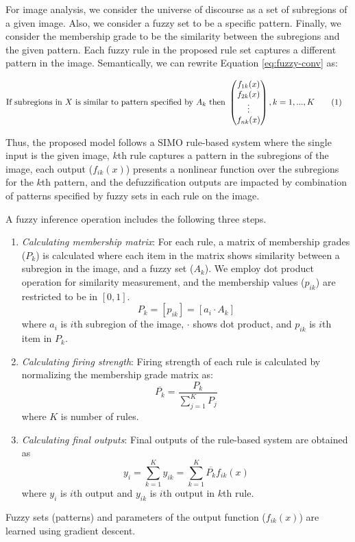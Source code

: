 \documentclass{article}
\newcommand\numberthis{\addtocounter{equation}{1}\tag{\theequation}}
\begin{document}
For image analysis, we consider the universe of discourse as a set of subregions of a given image. Also, we consider a fuzzy set to be a  specific pattern. Finally, we consider the membership grade to be the similarity between the subregions and the given pattern. Each fuzzy rule in the proposed rule set captures a different pattern in the image. Semantically, we can rewrite Equation \ref{eq:fuzzy-conv} 
as:

\begin{align*}
\textrm{If subregions in } X \textrm{ is similar to } & \textrm{pattern specified by } A_k \textrm{ then } \begin{pmatrix}f_{1k}(x) \\  f_{2k}(x) \\ \vdots \\  f_{nk}(x)\end{pmatrix},    k=1,...,K   \numberthis \label{eq:fuzzy-conv2}
\end{align*}

Thus, the proposed model follows a SIMO rule-based system where the single input is the given image, $k$th rule captures a pattern in the subregions of the image, each output ($f_{ik}(x)$) presents a nonlinear function over the subregions for the $k$th pattern, and the defuzzification outputs are impacted by combination of patterns specified by fuzzy sets in each rule on the image. 

A fuzzy inference operation includes the following three steps.

\begin{enumerate}
  \item 	\textit{Calculating membership matrix}: For each rule, a matrix of membership grades ($P_k$) is calculated where each item in the matrix shows similarity between a subregion in the image, and a fuzzy set ($A_k$). We employ dot product operation for similarity measurement, and the membership values ($p_{ik}$) are restricted to be in $[0,1]$.
  \begin{equation} \label{eq:mf-matrix}
{P_k}=[p_{ik}]=[a_i \cdot A_k]
\end{equation}
where $a_{i}$ is $i$th subregion of the image, $\cdot$ shows dot product, and $p_{ik}$ is $i$th item in $P_k$.
  \item \textit{Calculating firing strength}: Firing strength of each rule is calculated by normalizing the membership grade matrix as: 
\begin{equation} \label{eq:rule-strength}
\overline{P_k}=\frac{P_k}{\sum_{j=1}^K P_j}
\end{equation}
where $K$ is number of rules.
  \item	\textit{Calculating final outputs}: Final outputs of the rule-based system are obtained as
\begin{equation} \label{eq:rule-output}
y_i=\sum_{k=1}^K y_{ik}=\sum_{k=1}^K \overline{P_k}f_{ik}(x)
\end{equation}
where $y_i$ is $i$th output and $y_{ik}$ is $i$th output in $k$th rule.
\end{enumerate}
Fuzzy sets (patterns) and parameters of the output function ($f_{ik} (x)$) are learned using gradient descent.
\end{document}
